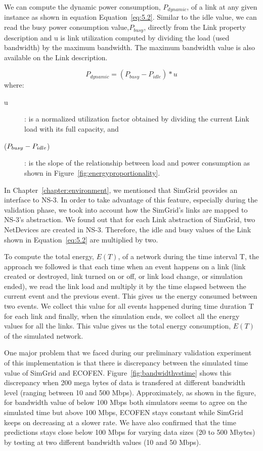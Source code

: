 We can compute the dynamic power consumption, \(P_{dynamic}\), of a link at any given instance as shown in equation Equation~\ref{eq:5.2}. Similar to the idle value, we can read the busy power consumption value,\(P_{busy}\), directly from the 
Link property description and u is link utilization computed by dividing the load (used bandwidth) by the maximum bandwidth. The maximum bandwidth value is also available on the Link description. 

\begin{equation} \label{eq:5.2}
P_{dynamic} = (P_{busy} - P_{idle}) * u 
\end{equation} 
where:
\begin{description}
    \item [u]: is a normalized utilization factor obtained by dividing the current Link load with its full capacity, and 
    \item [(\($$P_{busy} - P_{idle}$$\))]: is the slope of the relationship between load and power consumption as shown in Figure~\ref{fig:energyproportionality}.
\end{description} 
In Chapter~\ref{chapter:environment}, we mentioned that SimGrid provides an interface to NS-3. In order to take advantage of this feature, especially during the validation phase, we took into account how the SimGrid's links are mapped to NS-3's abstraction. We found out that for each Link abstraction of SimGrid, two NetDevices are created in NS-3. Therefore, the idle and busy values of the Link shown in Equation~\ref{eq:5.2} are multiplied by two.

To compute the total energy, \(E(T)\), of a network during the time interval T, the approach we followed is that each time when an event happens on a link (link created or destroyed, link turned on or off, or link load change, or simulation ended), we read the link load and multiply it by the time elapsed between the current event and the previous event. This gives us the energy consumed between two events. We collect this value for all events happened during time duration T for each link and finally, when the simulation ends, we collect all the energy values for all the links. This value gives us the total energy consumption, \(E(T)\) of the simulated network.

One major problem that we faced during our preliminary validation experiment of this implementation is that there is discrepancy between the simulated time value of SimGrid and ECOFEN. Figure~\ref{fig:bandwidthvstime} shows this discrepancy when 200 mega bytes of data is transfered at different bandwidth level (ranging between 10 and 500 Mbps). Approximately, as shown in the figure, for bandwidth value of below 100 Mbps both simulators seems to agree on the simulated time but above 100 Mbps, ECOFEN stays constant while SimGrid keeps on decreasing at a slower rate. We have also confirmed that the time predictions stays close below 100 Mbps for varying data sizes (20 to 500 Mbytes) by testing at two different bandwidth values (10 and 50 Mbps).

